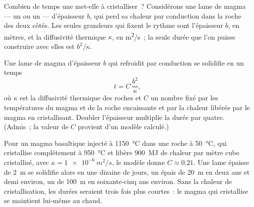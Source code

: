 Combien de temps une  met-elle à cristalliser~? Considérons une
lame de magma --- un  ou un  --- d'épaisseur $b$, qui perd sa
chaleur par conduction dans la roche des deux côtés. Les seules grandeurs
qui fixent le rythme sont l'épaisseur $b$, en mètres, et la diffusivité
thermique $\kappa$, en \unit{m^2/s}~; la seule durée que l'on puisse
construire avec elles est $b^2/\kappa$.

\begin{proposition}\label{prop:g11:igneous-rocks:cooling}
Une lame de magma d'épaisseur $b$ qui refroidit par conduction se solidifie
en un temps
\[
  t = C\,\frac{b^2}{\kappa},
\]
où $\kappa$ est la diffusivité thermique des roches et $C$ un nombre fixé
par les températures du magma et de la roche encaissante et par la chaleur
libérée par le magma en cristallisant. Doubler l'épaisseur multiplie la
durée par quatre. (Admis~; la valeur de $C$ provient d'un modèle calculé.)
\end{proposition}

Pour un magma basaltique injecté à \qty{1150}{\degreeCelsius} dans une
roche à \qty{50}{\degreeCelsius}, qui cristallise complètement à
\qty{950}{\degreeCelsius} et libère \qty{900}{MJ} de chaleur par mètre cube
cristallisé, avec $\kappa = \qty{1e-6}{m^2/s}$, le modèle donne
$C \approx 0.21$. Une lame épaisse de \qty{2}{m} se solidifie alors en une
dizaine de jours, un  épais de \qty{20}{m} en deux ans et demi environ,
un  de \qty{100}{m} en soixante-cinq ans environ. Sans la
chaleur de cristallisation, les durées seraient trois fois plus courtes~:
le magma qui cristallise se maintient lui-même au chaud.

